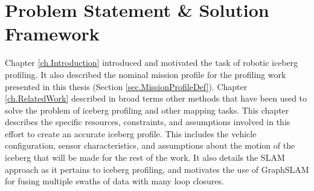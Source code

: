 
\chapter{Problem Statement \& Solution Framework}
\label{ch.ProblemStatement}

Chapter \ref{ch.Introduction}  introduced and motivated the task of robotic iceberg profiling. It also described the nominal mission profile for the profiling work presented in this thesis (Section \ref{sec.MissionProfileDef}). Chapter \ref{ch.RelatedWork} described in broad terms other methods that have been used to solve the problem of iceberg profiling and other mapping tasks. This chapter describes the specific resources, constraints, and assumptions involved in this effort to create an accurate iceberg profile. This includes the vehicle configuration, sensor characteristics, and assumptions about the motion of the iceberg that will be made for the rest of the work. It also details the SLAM approach as it pertains to iceberg profiling, and motivates the use of GraphSLAM for fusing multiple swaths of data with many loop closures. 


%
%
%

